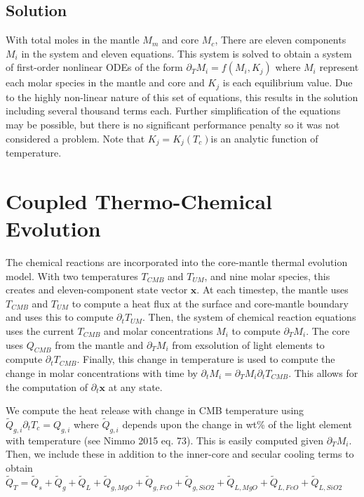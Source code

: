 \documentclass[]{article}
\begin{document}
\subsection{Solution} \label{solution}

With total moles in the mantle \(M_m\) and core \(M_c\), There are
eleven components \(M_i\) in the system and eleven equations. This
system is solved to obtain a system of first-order nonlinear ODEs of the
form \(\partial_T M_i = f(M_i, K_j)\) where \(M_i\) represent each
molar species in the mantle and core and \(K_j\) is each equilibrium
value. Due to the highly non-linear nature of this set of equations,
this results in the solution including several thousand terms each.
Further simplification of the equations may be possible, but there is no
significant performance penalty so it was not considered a problem. Note
that \(K_j =K_j(T_c)\)is an analytic function of temperature.


\section{Coupled Thermo-Chemical Evolution} \label{coupled-thermo-chemical-evolution}

The chemical reactions are incorporated into the core-mantle thermal
evolution model. With two temperatures \(T_{CMB}\) and \(T_{UM}\), and
nine molar species, this creates and eleven-component state vector
\(\mathbf{x}\). At each timestep, the mantle uses \(T_{CMB}\) and
\(T_{UM}\) to compute a heat flux at the surface and core-mantle
boundary and uses this to compute \(\partial_t T_{UM}\). Then, the
system of chemical reaction equations uses the current \(T_{CMB}\) and
molar concentrations \(M_i\) to compute \(\partial_T M_i\). The core
uses \(Q_{CMB}\) from the mantle and \(\partial_T M_i\) from exsolution
of light elements to compute \(\partial_t T_{CMB}\). Finally, this
change in temperature is used to compute the change in molar
concentrations with time by
\(\partial_t M_i = \partial_T M_i \partial_t T_{CMB}\). This allows
for the computation of \(\partial_t \mathbf{x}\) at any state.

We compute the heat release with change in CMB temperature using
\(\tilde{Q}_{g,i} \partial_t T_c = Q_{g,i}\) where \(\tilde{Q}_{g,i}\)
depends upon the change in wt\% of the light element with temperature
(see Nimmo 2015 eq. 73). This is easily computed given
\(\partial_T M_i\). Then, we include these in addition to the
inner-core and secular cooling terms to obtain
\(\tilde{Q}_T = \tilde{Q}_s+\tilde{Q}_g+\tilde{Q}_L +\tilde{Q}_{g,MgO}+\tilde{Q}_{g,FeO}+\tilde{Q}_{g,SiO2}+\tilde{Q}_{L,MgO}+\tilde{Q}_{L,FeO}+\tilde{Q}_{L,SiO2}\)
\end{document}
